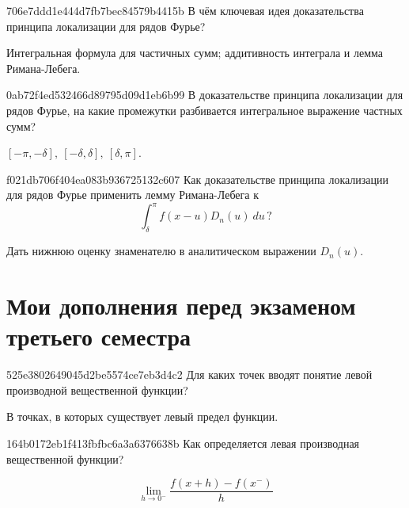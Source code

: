 \begin{note}{706e7ddd1e444d7fb7bec84579b4415b}
    В чём ключевая идея доказательства принципа локализации для рядов Фурье?

    \begin{cloze}{1}
        Интегральная формула для частичных сумм; аддитивность интеграла и лемма Римана-Лебега.
    \end{cloze}
\end{note}

\begin{note}{0ab72f4ed532466d89795d09d1eb6b99}
    В доказательстве принципа локализации для рядов Фурье, на какие промежутки разбивается интегральное выражение частных сумм?

    \begin{cloze}{1}
        \({ [-\pi, -\delta],\: [-\delta, \delta],\: [\delta, \pi] }\).
    \end{cloze}
\end{note}

\begin{note}{f021db706f404ea083b936725132c607}
    Как доказательстве принципа локализации для рядов Фурье применить лемму Римана-Лебега к
    \[
        \int_{\delta}^{\pi} f(x - u) D_n(u)\: du\,?
    \]

    \begin{cloze}{1}
        Дать нижнюю оценку знаменателю в аналитическом выражении \({ D_n(u) }\).
    \end{cloze}
\end{note}

\section{Мои дополнения перед экзаменом третьего семестра}
\begin{note}{525e3802649045d2be5574ce7eb3d4c2}
    Для каких точек вводят понятие левой производной вещественной функции?

    \begin{cloze}{1}
        В точках, в которых существует левый предел функции.
    \end{cloze}
\end{note}

\begin{note}{164b0172eb1f413fbfbc6a3a6376638b}
    Как определяется левая производная вещественной функции?

    \begin{cloze}{1}
        \[
           \lim_{h \to 0^{-}} \frac{f(x + h) - f(x^{-})}{h}
        \]
    \end{cloze}
\end{note}

